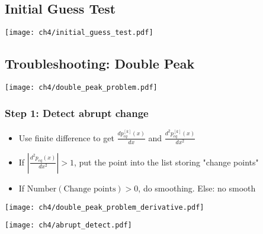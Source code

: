 \subsection{Initial Guess Test}
\begin{center}
    \texttt{[image: ch4/initial\_guess\_test.pdf]}   
\end{center}

\subsection{Troubleshooting: Double Peak}
\begin{center}
    \texttt{[image: ch4/double\_peak\_problem.pdf]}   
\end{center}
\subsubsection{Step 1: Detect abrupt change}
\begin{itemize}
    \item Use finite difference to get $\frac{d p^{[k]}_{eq}(x)}{dx}$ and $\frac{d^2 p^{[k]}_{eq}(x)}{dx^2}$
    \item If $|\frac{d^2 p_{eq}(x)}{dx^2}|>1$, put the point into the list storing "change points"
    \item If $\text{Number}(\text{Change points}) > 0$, do smoothing. Else: no smooth 
\end{itemize}
\begin{center}
    \texttt{[image: ch4/double\_peak\_problem\_derivative.pdf]}   
\end{center}
\begin{center}
    \texttt{[image: ch4/abrupt\_detect.pdf]}   
\end{center}

